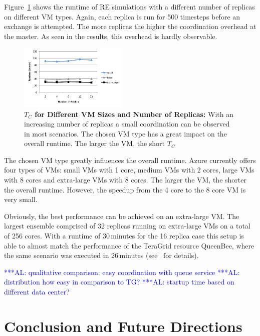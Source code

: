 \documentclass[conference,final]{IEEEtran}
\newcommand{\tc}{$T_{C}$ }
\newcommand{\alnote}[1]{ {\textcolor{blue} { ***AL: #1 }}}
\newcommand{\alnote}[1]{}
\begin{document}
Figure~\ref{fig:performance_repex_scaleout_vmsizes} shows the runtime of RE simulations
with a different number of replicas on different VM types. Again, each replica
is run for 500 timesteps before an exchange is attempted. The more replicas the higher the 
coordination overhead at the master. As seen in the results, this overhead is hardly 
observable.
\begin{figure}[ht]
    \centering
        \includegraphics[width=0.46\textwidth]{performance/repex_scaleout_vmsizes.pdf}
    \caption{\textbf{\tc for Different VM Sizes and Number of Replicas:} With
    an increasing number of replicas a small coordination can be observed in most 
    scenarios. The chosen VM type has a great impact on the overall runtime. The larger
    the VM, the short \tc}
    \label{fig:performance_repex_scaleout_vmsizes}
\end{figure}

The chosen VM type greatly influences the overall runtime. Azure currently offers four
types of VMs: small VMs with 1 core, medium VMs with 2 cores, large VMs with 8 cores
and extra-large VMs with 8 cores. The larger the VM, the shorter the overall runtime.
However, the speedup from the 4 core to the 8 core VM is very small. 

Obviously, the best performance can be achieved on an extra-large VM. The largest ensemble 
comprised of 32 replicas running on extra-large VMs on a total of 256 cores.
With a runtime of 30\,minutes for the 16 replica case this setup is able to almost 
match the performance of the TeraGrid resource QueenBee, where the same scenario 
was executed in 26\,minutes  (see~\cite{Luckow:2008fp} for details).



\alnote{qualitative comparison: easy coordination with queue service}
\alnote{distribution how easy in comparison to TG?}
\alnote{startup time based on different data center?}
\section{Conclusion and Future Directions}
\end{document}
